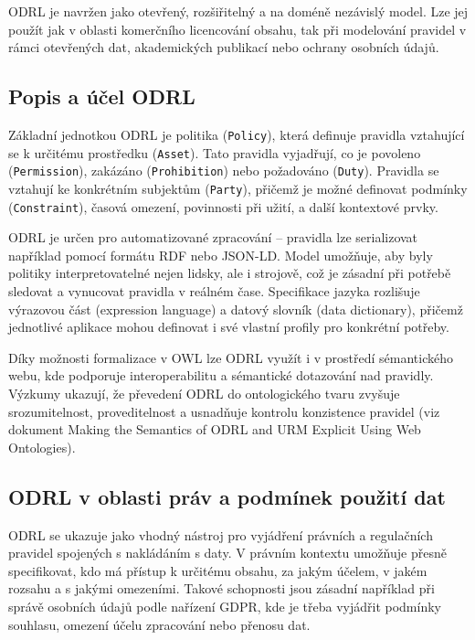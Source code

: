 ODRL je navržen jako otevřený, rozšiřitelný a na doméně nezávislý model. Lze jej použít jak v oblasti komerčního licencování obsahu, tak při modelování pravidel v rámci otevřených dat, akademických publikací nebo ochrany osobních údajů. \cite{Kasten}


\subsection{Popis a účel ODRL}
\label{sec:popis-odrl}

Základní jednotkou ODRL je politika (\texttt{Policy}), která definuje pravidla vztahující se k určitému prostředku (\texttt{Asset}). Tato pravidla vyjadřují, co je povoleno (\texttt{Permission}), zakázáno (\texttt{Prohibition}) nebo požadováno (\texttt{Duty}). Pravidla se vztahují ke konkrétním subjektům (\texttt{Party}), přičemž je možné definovat podmínky (\texttt{Constraint}), časová omezení, povinnosti při užití, a další kontextové prvky. \cite{W3C_odrl}

ODRL je určen pro automatizované zpracování – pravidla lze serializovat například pomocí formátu RDF nebo JSON-LD. Model umožňuje, aby byly politiky interpretovatelné nejen lidsky, ale i strojově, což je zásadní při potřebě sledovat a vynucovat pravidla v reálném čase. Specifikace jazyka rozlišuje výrazovou část (expression language) a datový slovník (data dictionary), přičemž jednotlivé aplikace mohou definovat i své vlastní profily pro konkrétní potřeby. \cite{Bassiliades2015}

Díky možnosti formalizace v OWL lze ODRL využít i v prostředí sémantického webu, kde podporuje interoperabilitu a sémantické dotazování nad pravidly. Výzkumy ukazují, že převedení ODRL do ontologického tvaru zvyšuje srozumitelnost, proveditelnost a usnadňuje kontrolu konzistence pravidel (viz dokument Making the Semantics of ODRL and URM Explicit Using Web Ontologies). \cite{Kasten}


\subsection{ODRL v oblasti práv a podmínek použití dat}
\label{sec:odrl-právní-předpisy}

ODRL se ukazuje jako vhodný nástroj pro vyjádření právních a regulačních pravidel spojených s nakládáním s daty. V právním kontextu umožňuje přesně specifikovat, kdo má přístup k určitému obsahu, za jakým účelem, v jakém rozsahu a s jakými omezeními. Takové schopnosti jsou zásadní například při správě osobních údajů podle nařízení GDPR, kde je třeba vyjádřit podmínky souhlasu, omezení účelu zpracování nebo přenosu dat. \cite{Bassiliades2015}


